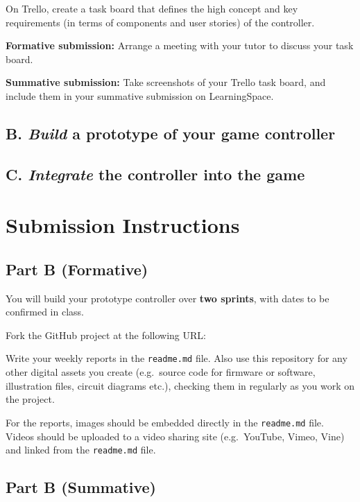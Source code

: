 \documentclass{../fal_assignment}
\begin{document}
On Trello, create a task board that defines the high concept and key requirements
(in terms of components and user stories) of the controller.

\textbf{Formative submission:} Arrange a meeting with your tutor to discuss your task board.

\textbf{Summative submission:} Take screenshots of your Trello task board,
    and include them in your summative submission on LearningSpace.

\subsection*{B. \emph{Build} a prototype of your game controller}

\subsection*{C. \emph{Integrate} the controller into the game}

\section*{Submission Instructions}

\subsection*{Part B (Formative)}

You will build your prototype controller over \textbf{two sprints},
with dates to be confirmed in class.



Fork the GitHub project at the following URL:


Write your weekly reports in the \texttt{readme.md} file.
Also use this repository for any other digital assets you create
(e.g.\ source code for firmware or software, illustration files, circuit diagrams etc.),
checking them in regularly as you work on the project.

For the reports, images should be embedded directly in the \texttt{readme.md} file.
Videos should be uploaded to a video sharing site (e.g.\ YouTube, Vimeo, Vine)
and linked from the \texttt{readme.md} file.

\subsection*{Part B (Summative)}
\end{document}
